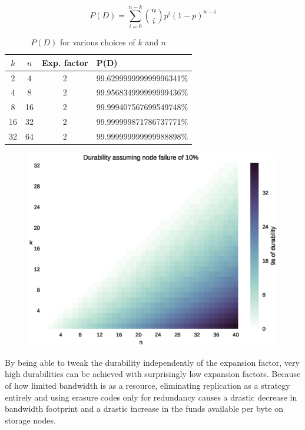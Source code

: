 \documentclass[a4paper,10pt]{article} \usepackage[utf8]{inputenc}
\begin{document}
\begin{equation} P(D) = \sum_{i=0}^{n-k} \binom{n}{i} p^i
(1-p)^{n-i}\label{eq:binom_cdf}
\end{equation}

\begin{table}[b]
\centering
\begin{tabular}{c c c l}
$k$ & $n$ & Exp. factor & P(D) \\
\hline 2 & 4 & 2 & 99.629999999999996341\%\\
4 & 8 & 2 & 99.956834999999999436\%\\
8 & 16 & 2 & 99.999407567699549748\%\\
16 & 32 & 2 & 99.999999871786737771\%\\
32 & 64 & 2 & 99.999999999999988898\%\\
\end{tabular}
\caption{$P(D)$ for various choices of $k$ and $n$}
\end{table}

\begin{figure} \centering
\includegraphics[width=\linewidth]{durability/durability.eps}
\end{figure}


By being able to tweak the durability independently of the expansion factor,
very high durabilities can be achieved with surprisingly low expansion factors.
Because of how limited bandwidth is as a resource, eliminating replication as a
strategy entirely and using erasure codes only for redundancy causes a drastic
decrease in bandwidth footprint and a drastic increase in the funds available
per byte on storage nodes.
\end{document}
